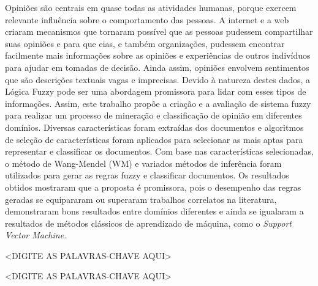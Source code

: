 \documentclass[msc, a4paper, classic, pt]{ufbathesis}
\begin{document}
\resumo
Opiniões são centrais em quase todas as atividades humanas, porque exercem relevante influência sobre o comportamento das pessoas. A internet e a web criaram mecanismos que tornaram possível que as pessoas pudessem compartilhar suas opiniões e para que eias, e também organizações, pudessem encontrar facilmente mais informações sobre as opiniões e experiências de outros indivíduos para ajudar em tomadas de decisão. Ainda assim, opiniões envolvem sentimentos que são descrições textuais vagas e imprecisas. Devido à natureza destes dados, a Lógica Fuzzy pode ser uma abordagem promissora para lidar com esses tipos de informações. Assim, este trabalho propõe a criação e a avaliação de sistema fuzzy para realizar um processo de mineração e classificação de opinião em diferentes domínios. Diversas características foram extraídas dos documentos e algoritmos de seleção de características foram aplicados para selecionar as mais aptas para representar e classificar os documentos. Com base nas características selecionadas, o método de Wang-Mendel (WM) e variados métodos de inferência foram utilizados para gerar as regras fuzzy e classificar documentos. Os resultados obtidos mostraram que a proposta é promissora, pois o desempenho das regras geradas se equipararam ou superaram trabalhos correlatos na literatura, demonstraram bons resultados entre domínios diferentes e ainda se igualaram a resultados de métodos clássicos de aprendizado de máquina, como o \textit{Support Vector Machine}. 
\begin{keywords}
<DIGITE AS PALAVRAS-CHAVE AQUI>
\end{keywords}

\abstract
\begin{keywords}
<DIGITE AS PALAVRAS-CHAVE AQUI>
\end{keywords}

\tableofcontents

\listoffigures

\listoftables

\mainmatter

% 
% 
% 
%
\end{document}
